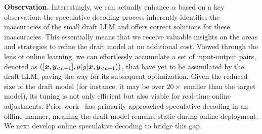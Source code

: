 {\bf Observation.} Interestingly, we can actually enhance \(\alpha\) based on a key observation: the speculative decoding process inherently identifies the inaccuracies of the small draft LLM and offers correct solutions for these inaccuracies. This essentially means that we receive valuable insights on the areas and strategies to refine the draft model at no additional cost. 
Viewed through the lens of online learning, we can effortlessly accumulate a set of input-output pairs, denoted as \( ([{\bm{x}}, {\bm{y}}_{<a+1}], p(y|{\bm{x}}, {{\bm{y}}}_{<a+1})) \), that have yet to be assimilated by the draft LLM, paving the way for its subsequent optimization. Given the reduced size of the draft model (for instance, it may be over $20\times$ smaller than the target model), its tuning is not only efficient but also viable for real-time online adjustments. 
Prior work~\citep{leviathan2023fast,miao2023specinfer} has primarily approached speculative decoding in an offline manner, meaning the draft model remains static during online deployment. We next develop online speculative decoding to bridge this gap.






